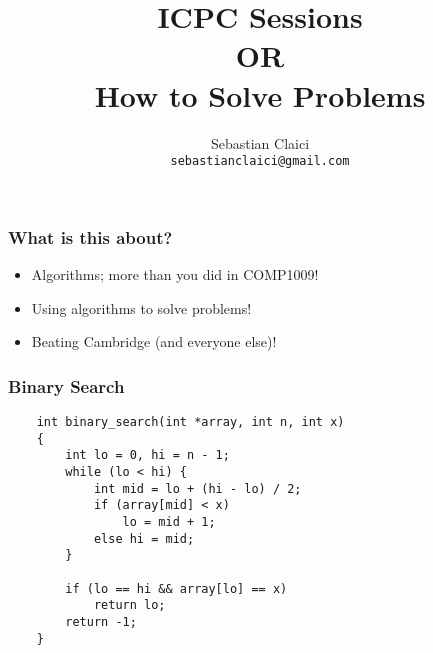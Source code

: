 \documentclass{beamer}
\title{ICPC Sessions \\
    OR \\
    How to Solve Problems
}
\author{Sebastian Claici \\
    \texttt{sebastianclaici@gmail.com}
}
\begin{document}
\maketitle

\begin{frame}
    \frametitle{What is this about?}
    \begin{itemize}
        \item Algorithms; more than you did in COMP1009!
            \pause
        \item Using algorithms to solve problems!
            \pause
        \item Beating Cambridge (and everyone else)!
    \end{itemize}
\end{frame}

\begin{frame}[fragile]
    \frametitle{Binary Search}
    \lstset{language=C}
    \begin{lstlisting}
    int binary_search(int *array, int n, int x)
    {
        int lo = 0, hi = n - 1;
        while (lo < hi) {
            int mid = lo + (hi - lo) / 2;
            if (array[mid] < x)
                lo = mid + 1;
            else hi = mid;
        }

        if (lo == hi && array[lo] == x)
            return lo;
        return -1;
    }
    \end{lstlisting}
\end{frame}
\end{document}
